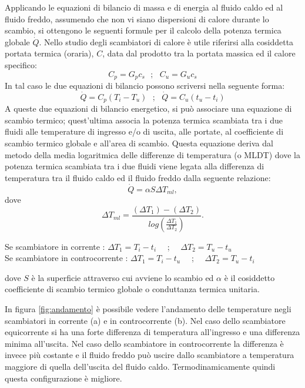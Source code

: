 \documentclass[laurea,oneside,11pt]{USiena_tesiLM}
\begin{document}
Applicando le equazioni di bilancio di massa e di energia al fluido caldo ed al fluido freddo, assumendo che non vi siano dispersioni di calore durante lo scambio, si ottengono le seguenti formule per il calcolo della potenza termica globale $\dot{Q}$. Nello studio degli scambiatori di calore è  utile riferirsi alla cosiddetta portata termica (oraria), $C$, data dal prodotto tra la portata massica ed il calore specifico:
\begin{equation}
C_p=G_p c_s  \ \ \ ; \ \ \ C_u=G_u c_s
\end{equation}
In tal caso le due equazioni di bilancio  possono scriversi nella seguente forma:
\begin{equation}
\dot{Q}=C_p(T_i - T_u) \ \ \ ; \ \ \ \dot{Q}=C_u(t_u - t_i)
\label{eq:scambiatore1}
\end{equation}
A queste due equazioni di bilancio energetico, si può associare una equazione di scambio termico; quest'ultima associa la potenza termica scambiata tra i due fluidi alle temperature di ingresso e/o di uscita, alle portate, al coefficiente di scambio termico globale e all'area di scambio. Questa equazione deriva dal metodo della media logaritmica delle differenze di temperatura (o MLDT) dove  la potenza termica scambiata tra i due fluidi viene legata alla differenza di temperatura tra il fluido caldo ed il fluido freddo dalla seguente relazione:
\begin{equation}
\dot{Q}=\alpha S \Delta T_{ml} ,
\end{equation}
dove
\begin{equation}
 \Delta T_{ml} = \frac{(\Delta T_1)-(\Delta T_2)}{log\left( \frac{\Delta T_1}{\Delta T_2} \right)}.
 \label{eq:scambiatore2}
 \end{equation}
 \begin{center}
 Se scambiatore in corrente : $ \Delta T_1 = T_i - t_i $  \ \ ; \ \ $ \Delta T_2 = T_u - t_u $  \\
 
 Se scambiatore in controcorrente : $ \Delta T_1 = T_i - t_u $  \ \ ; \ \ $ \Delta T_2 = T_u - t_i $ 
\end{center}
dove $S$ \`e  la superficie attraverso cui avviene lo scambio ed $\alpha$ \`e  il cosiddetto coefficiente di scambio termico globale o conduttanza termica unitaria. 

In figura \ref{fig:andamento} è  possibile vedere l'andamento delle temperature negli scambiatori in corrente (a) e in controcorrente (b).
Nel caso dello scambiatore equicorrente si ha una forte differenza di temperatura all'ingresso e una differenza  minima  all'uscita.  Nel  caso  dello  scambiatore in controcorrente  la  differenza  è invece più costante e il fluido freddo può uscire dallo scambiatore a temperatura maggiore di  quella  dell'uscita del fluido  caldo. 
Termodinamicamente quindi  questa  configurazione  è migliore. 
\end{document}
